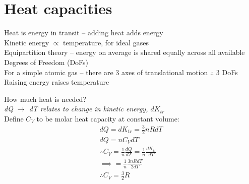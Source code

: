 \documentclass[a4paper, 11pt, normalem]{report}
\begin{document}
\section{Heat capacities}
Heat is energy in transit -- adding heat adds energy \\
Kinetic energy $\propto$ temperature, for ideal gases \\
Equipartition theory -- energy on average is shared equally across all available Degrees of Freedom (DoFs) \\
For a simple atomic gas -- there are 3 axes of translational motion $\therefore$ 3 DoFs \\
Raising energy raises temperature

How much heat is needed? \\
\textit{dQ $\rightarrow$ dT relates to change in kinetic energy, $dK_{tr}$}\\
Define $C_{V}$ to be molar heat capacity at constant volume:
\begin{gather*}
	dQ = dK_{tr} = \frac{3}{2}nRdT \\
	dQ = nC_{V}dT \\
	\therefore C_{V} = \frac{1}{n}\frac{dQ}{dT} = \frac{1}{n}\frac{dK_{tr}}{dT} \\
	\implies = \frac{1}{n}\frac{3nRdT}{2dT} \\
	\therefore C_{V} = \frac{3}{2}R
\end{gather*}
\end{document}

